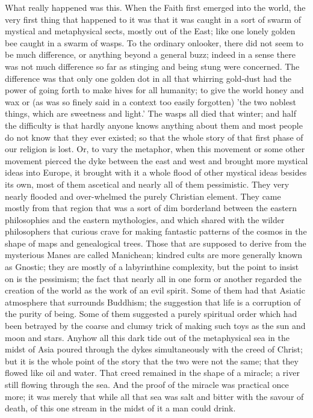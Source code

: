What really happened was this. When the Faith first emerged into the world, the very first thing that happened to it was that it was caught in a sort of swarm of mystical and metaphysical sects, mostly out of the East; like one lonely golden bee caught in a swarm of wasps. To the ordinary onlooker, there did not seem to be much difference, or anything beyond a general buzz; indeed in a sense there was not much difference so far as stinging and being stung were concerned. The difference was that only one golden dot in all that whirring gold-dust had the power of going forth to make hives for all humanity; to give the world honey and wax or (as was so finely said in a context too easily forgotten) 'the two noblest things, which are sweetness and light.' The wasps all died that winter; and half the difficulty is that hardly anyone knows anything about them and most people do not know that they ever existed; so that the whole story of that first phase of our religion is lost. Or, to vary the metaphor, when this movement or some other movement pierced the dyke between the east and west and brought more mystical ideas into Europe, it brought with it a whole flood of other mystical ideas besides its own, most of them ascetical and nearly all of them pessimistic. They very nearly flooded and over-whelmed the purely Christian element. They came mostly from that region that was a sort of dim borderland between the eastern philosophies and the eastern mythologies, and which shared with the wilder philosophers that curious crave for making fantastic patterns of the cosmos in the shape of maps and genealogical trees. Those that are supposed to derive from the mysterious Manes are called Manichean; kindred cults are more generally known as Gnostic; they are mostly of a labyrinthine complexity, but the point to insist on is the pessimism; the fact that nearly all in one form or another regarded the creation of the world as the work of an evil spirit. Some of them had that Asiatic atmosphere that surrounds Buddhism; the suggestion that life is a corruption of the purity of being. Some of them suggested a purely spiritual order which had been betrayed by the coarse and clumsy trick of making such toys as the sun and moon and stars. Anyhow all this dark tide out of the metaphysical sea in the midst of Asia poured through the dykes simultaneously with the creed of Christ; but it is the whole point of the story that the two were not the same; that they flowed like oil and water. That creed remained in the shape of a miracle; a river still flowing through the sea. And the proof of the miracle was practical once more; it was merely that while all that sea was salt and bitter with the savour of death, of this one stream in the midst of it a man could drink.

